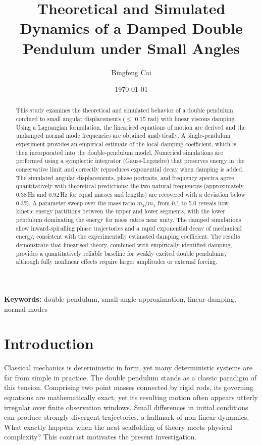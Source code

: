 \documentclass[12pt, a4paper, twoside]{article}
\title{\textbf{Theoretical and Simulated Dynamics of a Damped Double Pendulum under Small Angles}}
\author{Bingfeng Cai}
\date{\today}
\begin{document}
\maketitle

\begin{abstract}

This study examines the theoretical and simulated behavior of a double pendulum confined to small angular displacements ($\le$ 0.15 rad) with linear viscous damping. Using a Lagrangian formulation, the linearised equations of motion are derived and the undamped normal mode frequencies are obtained analytically. A single‑pendulum experiment provides an empirical estimate of the local damping coefficient, which is then incorporated into the double‑pendulum model. Numerical simulations are performed using a symplectic integrator (Gauss‑Legendre) that preserves energy in the conservative limit and correctly reproduces exponential decay when damping is added. The simulated angular displacements, phase portraits, and frequency spectra agree quantitatively with theoretical predictions: the two natural frequencies (approximately 0.38 Hz and 0.92 Hz for equal masses and lengths) are recovered with a deviation below 0.3\%. A parameter sweep over the mass ratio \(m_2/m_1\) from 0.1 to 5.0 reveals how kinetic energy partitions between the upper and lower segments, with the lower pendulum dominating the energy for mass ratios near unity. The damped simulations show inward‑spiralling phase trajectories and a rapid exponential decay of mechanical energy, consistent with the experimentally estimated damping coefficient. The results demonstrate that linearised theory, combined with empirically identified damping, provides a quantitatively reliable baseline for weakly excited double pendulums, although fully nonlinear effects require larger amplitudes or external forcing.
\end{abstract}

\textbf{Keywords:} double pendulum, small-angle approximation, linear damping, normal modes

\tableofcontents
\newpage

\section{Introduction}

Classical mechanics is deterministic in form, yet many deterministic systems are far from simple in practice. The double pendulum stands as a classic paradigm of this tension. Comprising two point masses connected by rigid rods, its governing equations are mathematically exact, yet its resulting motion often appears utterly irregular over finite observation windows. Small differences in initial conditions can produce strongly divergent trajectories, a hallmark of non-linear dynamics. What exactly happens when the neat scaffolding of theory meets physical complexity? This contrast motivates the present investigation.
\end{document}

